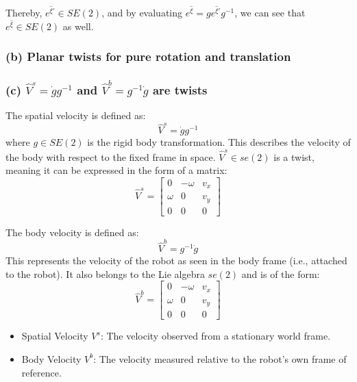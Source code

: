 Thereby, \( e^{\hat \xi'} \in SE(2) \), and by evaluating \( e^{\hat \xi} = g e^{\hat \xi'} g^{-1} \), we can see that \( e^{\hat \xi} \in SE(2) \) as well.

\subsubsection*{(b) Planar twists for pure rotation and translation}

\subsubsection*{(c) \( \hat{V}^{s} = \dot{g} g^{-1} \) and \( \hat{V}^{b} = g^{-1} \dot{g} \) are twists}

The spatial velocity is defined as:
\[
    \hat{V}^{s} = \dot{g} g^{-1}
\]
where \( g \in SE(2) \) is the rigid body transformation. This describes the velocity of the body with respect to the fixed frame in space. \( \hat{V}^{s} \in se(2) \) is a twist, meaning it can be expressed in the form of a matrix:
\[
    \hat{V}^{s} = \begin{bmatrix}
        0      & -\omega & v_x \\
        \omega & 0       & v_y \\
        0      & 0       & 0
    \end{bmatrix}
\]

The body velocity is defined as:
\[
    \hat{V}^{b} = g^{-1} \dot{g}
\]
This represents the velocity of the robot as seen in the body frame (i.e., attached to the robot). It also belongs to the Lie algebra \( se(2) \) and is of the form:
\[
    \hat{V}^{b} = \begin{bmatrix}
        0      & -\omega & v_x \\
        \omega & 0       & v_y \\
        0      & 0       & 0
    \end{bmatrix}
\]

\begin{itemize}
    \item Spatial Velocity \( V^s \): The velocity observed from a stationary world frame.
    \item Body Velocity \( V^b \): The velocity measured relative to the robot's own frame of reference.
\end{itemize}

